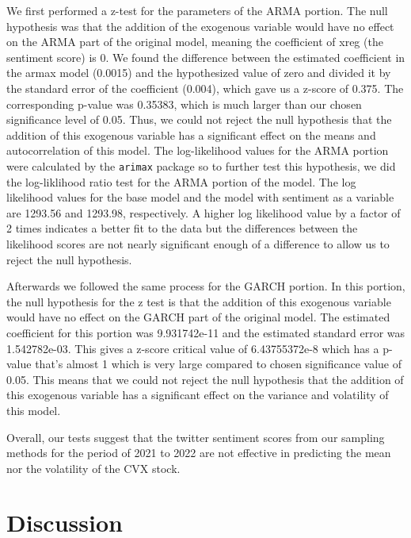 \documentclass[12pt, letterpaper, titlepage]{article}
\begin{document}
We first performed a z-test for the parameters of the ARMA portion. The null hypothesis was that the addition of the exogenous variable would have no effect on the ARMA part of the original model, meaning the coefficient of xreg (the sentiment score) is 0. We found the difference between the estimated coefficient in the armax model (0.0015) and the hypothesized value of zero and divided it by the standard error of the coefficient (0.004), which gave us a z-score of 0.375. The corresponding p-value was 0.35383, which is much larger than our chosen significance level of 0.05. Thus, we could not reject the null hypothesis that the addition of this exogenous variable has a significant effect on the means and autocorrelation of this model.  The log-likelihood values for the ARMA portion were calculated by the \texttt{arimax} package so to further test this hypothesis, we did the log-liklihood ratio test for the ARMA portion of the model. The log likelihood values for the base model and the model with sentiment as a variable are 1293.56 and 1293.98, respectively. A higher log likelihood value by a factor of 2 times indicates a better fit to the data but the differences between the likelihood scores are not nearly significant enough of a difference to allow us to reject the null hypothesis.

Afterwards we followed the same process for the GARCH portion. In this portion, the null hypothesis for the z test is that the addition of this exogenous variable would have no effect on the GARCH part of the original model. The estimated coefficient for this portion was 9.931742e-11  and the estimated standard error was 1.542782e-03. This gives a z-score critical value of 6.43755372e-8 which has a p-value that's almost 1 which is very large compared to chosen significance value of 0.05. This means that we could not reject the null hypothesis that the addition of this exogenous variable has a significant effect on the variance and volatility of this model. 

Overall, our tests suggest that the twitter sentiment scores from our sampling methods for the period of 2021 to 2022 are not effective in predicting the mean nor the volatility of the CVX stock.

\label{sec: discussion}
\section{Discussion}
\end{document}
